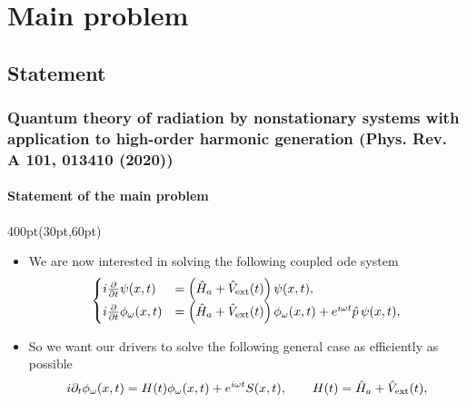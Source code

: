 \section{Main problem}
\subsection{Statement}
\begin{frame}
\frametitle{Quantum theory of radiation by nonstationary systems 
	with application to high-order harmonic generation
        (Phys. Rev. A 101, 013410 (2020))}
        \framesubtitle{Statement of the main problem}
\footnotesize
\begin{textblock*}{400pt}(30pt,60pt)
\begin{itemize}
\item We are now interested in solving the following coupled ode system
\begin{align}
\begin{cases}
	i\frac{\partial}{\partial t}\psi(x,t)
	   & = \left( \hat{H}_a + \hat{V}_{\rm ext}(t)\right) 
	   \psi(x,t),\\
	i\frac{\partial}{\partial t}\phi_\omega(x,t)
	   & = \left( \hat{H}_a + \hat{V}_{\rm ext}(t)\right) 
	   \phi_\omega (x,t)
 	   + e^{i\omega t} {\hat{p}}\,
	   \psi(x,t), \label{eqn:main_1d} 
\end{cases}
\end{align}


\item So we want our drivers to solve the following 
	general case as efficiently as possible
\begin{align}
	i\partial_t \phi_\omega(x,t)  = H(t)\phi_\omega(x,t) + e^{i\omega t}S(x,t),
	\hspace{20pt} H(t) = \hat{H}_a + \hat{V}_{\rm ext}(t),
\end{align}


\end{itemize}
\end{textblock*}
\end{frame}
